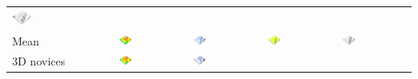 \documentclass[Afour,sageh,times]{sagej}
\begin{document}
\begin{table}[h]
\begin{tabular}{m{} m{} m{} m{} m{}}
\includegraphics[width=0.2\textwidth]{images/render_3d/3d_experts/dem_difference_5.png}\\
%
Mean & 
\includegraphics[width=0.2\textwidth]{images/render_3d/participants/mean_dem_5.png} &
\includegraphics[width=0.2\textwidth]{images/render_3d/participants/stdev_regression_difference_series_5.png} &
\includegraphics[width=0.2\textwidth]{images/render_3d/participants/mean_depth_5.png} &
\includegraphics[width=0.2\textwidth]{images/render_3d/participants/mean_depth_difference_5.png}\\
%
3D novices & 
\includegraphics[width=0.2\textwidth]{images/render_3d/3d_novices/mean_dem_5.png} &
\includegraphics[width=0.2\textwidth]{images/render_3d/3d_novices/stdev_regression_difference_series_5.png} &

\end{tabular}
\end{table}
\end{document}

